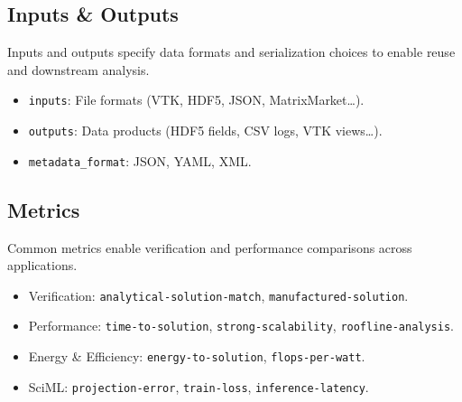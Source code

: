 \subsection{Inputs \& Outputs}
Inputs and outputs specify data formats and serialization choices to enable reuse and downstream analysis.
\begin{itemize}
  \item \texttt{inputs}: File formats (VTK, HDF5, JSON, MatrixMarket…).  
  \item \texttt{outputs}: Data products (HDF5 fields, CSV logs, VTK views…).  
  \item \texttt{metadata\_format}: JSON, YAML, XML.
\end{itemize}

\subsection{Metrics}
Common metrics enable verification and performance comparisons across applications.
\begin{itemize}
  \item Verification: \texttt{analytical-solution-match}, \texttt{manufactured-solution}.  
  \item Performance: \texttt{time-to-solution}, \texttt{strong-scalability}, \texttt{roofline-analysis}.  
  \item Energy \& Efficiency: \texttt{energy-to-solution}, \texttt{flops-per-watt}.  
  \item SciML: \texttt{projection-error}, \texttt{train-loss}, \texttt{inference-latency}.
\end{itemize}

